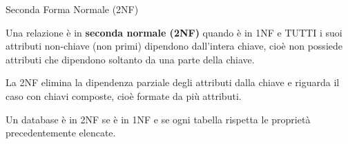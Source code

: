 \begin{frame}{Seconda Forma Normale (2NF)}
\vspace{-1cm}
\begin{minipage}{0.9\textwidth}
    Una relazione \`e in \textbf{seconda normale (2NF)} quando \`e in 1NF e TUTTI i suoi attributi non-chiave (non primi) dipendono dall'intera chiave, cio\`e non possiede attributi che dipendono soltanto da una parte della chiave.
    \pause

    \vspace{.2cm}
    La 2NF elimina la dipendenza parziale degli attributi dalla chiave e riguarda il caso con chiavi composte, cio\`e formate da pi\`u attributi.

    \pause


    \begin{minipage}{0.8\textwidth}
    \vspace{.2cm}
    Un database \`e in 2NF se \`e in 1NF e se ogni tabella rispetta le propriet\`a precedentemente elencate.
    \end{minipage}
    \end{minipage}
\end{frame}
%
